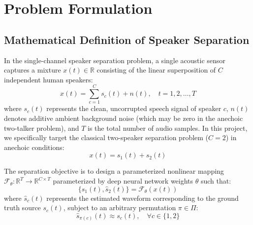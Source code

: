 \documentclass[11pt,a4paper]{report}
\begin{document}
\chapter{Problem Formulation}
\label{chap:problem_formulation}

\section{Mathematical Definition of Speaker Separation}
In the single-channel speaker separation problem, a single acoustic sensor captures a mixture $x(t) \in \mathbb{R}$ consisting of the linear superposition of $C$ independent human speakers:
\begin{equation}
    x(t) = \sum_{c=1}^C s_c(t) + n(t), \quad t = 1, 2, \dots, T
    \label{eq:separation_mixture}
\end{equation}
where $s_c(t)$ represents the clean, uncorrupted speech signal of speaker $c$, $n(t)$ denotes additive ambient background noise (which may be zero in the anechoic two-talker problem), and $T$ is the total number of audio samples. In this project, we specifically target the classical two-speaker separation problem ($C=2$) in anechoic conditions:
\begin{equation}
    x(t) = s_1(t) + s_2(t)
    \label{eq:2speaker_mixture}
\end{equation}

The separation objective is to design a parameterized nonlinear mapping $\mathcal{F}_\theta: \mathbb{R}^T \rightarrow \mathbb{R}^{C \times T}$ parameterized by deep neural network weights $\theta$ such that:
\begin{equation}
    \{\hat{s}_1(t), \hat{s}_2(t)\} = \mathcal{F}_\theta(x(t))
\end{equation}
where $\hat{s}_c(t)$ represents the estimated waveform corresponding to the ground truth source $s_c(t)$, subject to an arbitrary permutation $\pi \in \Pi$:
\begin{equation}
    \hat{s}_{\pi(c)}(t) \approx s_c(t), \quad \forall c \in \{1, 2\}
\end{equation}
\end{document}
